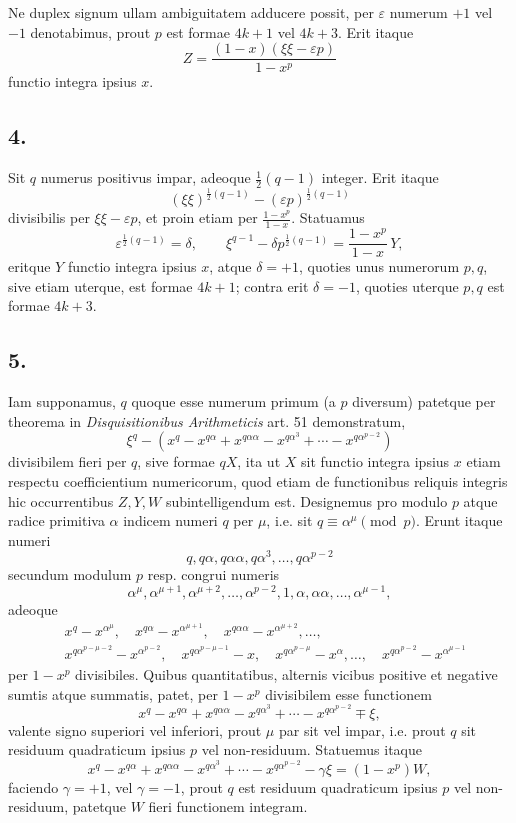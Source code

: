 \documentclass[12pt]{article}
\begin{document}
Ne duplex signum ullam ambiguitatem adducere possit, per $\varepsilon$ numerum $+1$ vel $-1$ denotabimus, prout $p$ est formae $4k+1$ vel $4k+3$. Erit itaque
\[
Z=\frac{(1-x)(\xi\xi-\varepsilon p)}{1-x^p}
\]
functio integra ipsius $x$.

\subsection*{4.}

Sit $q$ numerus positivus impar, adeoque $\frac12(q-1)$ integer. Erit itaque
\[
(\xi\xi)^{\frac12(q-1)}-(\varepsilon p)^{\frac12(q-1)}
\]
divisibilis per $\xi\xi-\varepsilon p$, et proin etiam per $\frac{1-x^p}{1-x}$. Statuamus
\[
\varepsilon^{\frac12(q-1)}=\delta,\qquad
\xi^{q-1}-\delta p^{\frac12(q-1)}=\frac{1-x^p}{1-x}\,Y,
\]
eritque $Y$ functio integra ipsius $x$, atque $\delta=+1$, quoties unus numerorum $p,q$, sive etiam uterque, est formae $4k+1$; contra erit $\delta=-1$, quoties uterque $p,q$ est formae $4k+3$.

\subsection*{5.}

Iam supponamus, $q$ quoque esse numerum primum (a $p$ diversum) patetque per theorema in \emph{Disquisitionibus Arithmeticis} art. 51 demonstratum,
\[
\xi^q-\left(x^q-x^{q\alpha}+x^{q\alpha\alpha}-x^{q\alpha^3}+\cdots-x^{q\alpha^{p-2}}\right)
\]
divisibilem fieri per $q$, sive formae $qX$, ita ut $X$ sit functio integra ipsius $x$ etiam respectu coefficientium numericorum, quod etiam de functionibus reliquis integris hic occurrentibus $Z,Y,W$ subintelligendum est. Designemus pro modulo $p$ atque radice primitiva $\alpha$ indicem numeri $q$ per $\mu$, i.e. sit $q\equiv \alpha^\mu \pmod p$. Erunt itaque numeri
\[
q,q\alpha,q\alpha\alpha,q\alpha^3,\ldots,q\alpha^{p-2}
\]
secundum modulum $p$ resp. congrui numeris
\[
\alpha^\mu,\alpha^{\mu+1},\alpha^{\mu+2},\ldots,\alpha^{p-2},1,\alpha,\alpha\alpha,\ldots,\alpha^{\mu-1},
\]
adeoque
\[
\begin{aligned}
&x^q-x^{\alpha^\mu},\quad x^{q\alpha}-x^{\alpha^{\mu+1}},\quad
x^{q\alpha\alpha}-x^{\alpha^{\mu+2}},\ldots,\\
&x^{q\alpha^{p-\mu-2}}-x^{\alpha^{p-2}},\quad
x^{q\alpha^{p-\mu-1}}-x,\quad
x^{q\alpha^{p-\mu}}-x^\alpha,\ldots,\quad
x^{q\alpha^{p-2}}-x^{\alpha^{\mu-1}}
\end{aligned}
\]
per $1-x^p$ divisibiles. Quibus quantitatibus, alternis vicibus positive et negative sumtis atque summatis, patet, per $1-x^p$ divisibilem esse functionem
\[
x^q-x^{q\alpha}+x^{q\alpha\alpha}-x^{q\alpha^3}+\cdots-x^{q\alpha^{p-2}}\mp \xi,
\]
valente signo superiori vel inferiori, prout $\mu$ par sit vel impar, i.e. prout $q$ sit residuum quadraticum ipsius $p$ vel non-residuum. Statuemus itaque
\[
x^q-x^{q\alpha}+x^{q\alpha\alpha}-x^{q\alpha^3}+\cdots-x^{q\alpha^{p-2}}-\gamma\xi=(1-x^p)W,
\]
faciendo $\gamma=+1$, vel $\gamma=-1$, prout $q$ est residuum quadraticum ipsius $p$ vel non-residuum, patetque $W$ fieri functionem integram.
\end{document}
